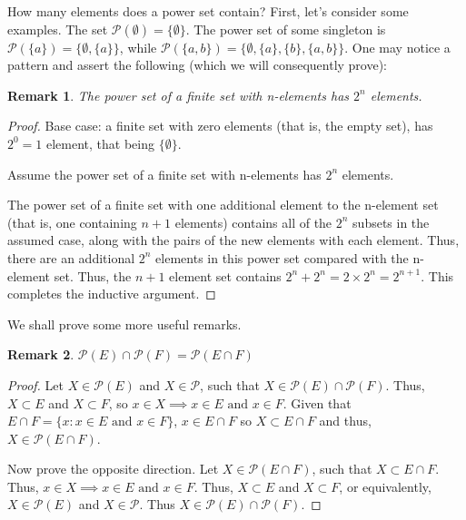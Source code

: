 \documentclass[12pt]{article}
\newtheorem{remark}{Remark}
\begin{document}
How many elements does a power set contain? First, let's consider some examples. The set $\mathcal{P}(\emptyset) = \{\emptyset\}$.
The power set of some singleton is $\mathcal{P}(\{a\}) = \{\emptyset, \{a\}\}$, while $\mathcal{P}(\{a, b\}) = \{\emptyset, \{a\}, \{b\}, \{a, b\}\}$.
One may notice a pattern and assert the following (which we will consequently prove):

\begin{remark}
    The power set of a finite set with n-elements has $2^n$ elements.
\end{remark}
\begin{proof}
    Base case: a finite set with zero elements (that is, the empty set), has $2^0 = 1$ element, that being
    $\{\emptyset\}$.

    Assume the power set of a finite set with n-elements has $2^n$ elements.

    The power set of a finite set with one additional element to the n-element set (that is, one containing $n + 1$ elements)
    contains all of the $2^n$ subsets in the assumed case, along with the pairs of the new elements with each element. Thus,
    there are an additional $2^n$ elements in this power set compared with the n-element set. Thus, the $n + 1$
    element set contains $2^n + 2^n = 2 \times 2^n = 2^{n + 1}$. This completes the inductive argument.
\end{proof}

We shall prove some more useful remarks.

\begin{remark}
    $\mathcal{P}(E) \cap \mathcal{P}(F) = \mathcal{P}(E \cap F)$
\end{remark}
\begin{proof}
    Let $X \in \mathcal{P}(E)$ and $X \in \mathcal{P}$, such that $X \in \mathcal{P}(E) \cap \mathcal{P}(F)$.
    Thus, $X \subset E$ and $X \subset F$, so $x \in X \implies x \in E\text{ and } x \in F$.
    Given that $E \cap F = \{x: x \in E\text{ and } x \in F\}$, $x \in E\cap F$ so $X \subset E \cap F$ and
    thus, $X \in \mathcal{P}(E \cap F)$.

    Now prove the opposite direction. Let $X \in \mathcal{P}(E \cap F)$, such that $X \subset E \cap F$.
    Thus, $x \in X \implies x \in E \text{ and } x\in F$. Thus, $X \subset E$ and $X\subset F$, or equivalently,
    $X \in \mathcal{P}(E)$ and $X \in \mathcal{P}$. Thus $X \in \mathcal{P}(E) \cap \mathcal{P}(F)$.
\end{proof}
\end{document}
